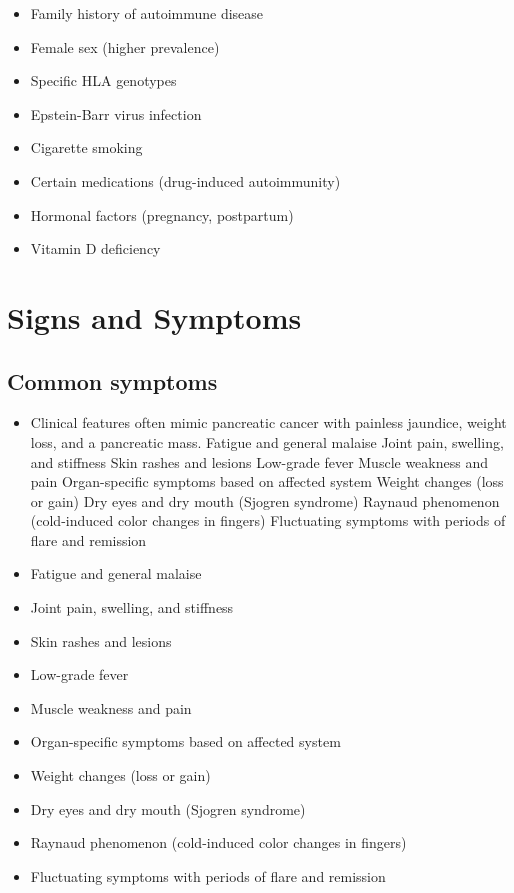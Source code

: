 \begin{itemize}[noitemsep]
  \item Family history of autoimmune disease
  \item Female sex (higher prevalence)
  \item Specific HLA genotypes
  \item Epstein-Barr virus infection
  \item Cigarette smoking
  \item Certain medications (drug-induced autoimmunity)
  \item Hormonal factors (pregnancy, postpartum)
  \item Vitamin D deficiency
\end{itemize}
\section{Signs and Symptoms}

\subsection{Common symptoms}
\begin{itemize}[noitemsep]
  \item Clinical features often mimic pancreatic cancer with painless jaundice, weight loss, and a pancreatic mass. Fatigue and general malaise Joint pain, swelling, and stiffness Skin rashes and lesions Low-grade fever Muscle weakness and pain Organ-specific symptoms based on affected system Weight changes (loss or gain) Dry eyes and dry mouth (Sjogren syndrome) Raynaud phenomenon (cold-induced color changes in fingers) Fluctuating symptoms with periods of flare and remission
  \item Fatigue and general malaise
  \item Joint pain, swelling, and stiffness
  \item Skin rashes and lesions
  \item Low-grade fever
  \item Muscle weakness and pain
  \item Organ-specific symptoms based on affected system
  \item Weight changes (loss or gain)
  \item Dry eyes and dry mouth (Sjogren syndrome)
  \item Raynaud phenomenon (cold-induced color changes in fingers)
  \item Fluctuating symptoms with periods of flare and remission
\end{itemize}

